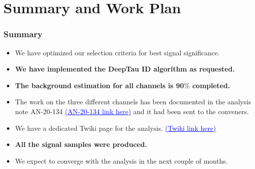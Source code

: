 \documentclass[8pt,xcolor=dvipsnames,xcolor=table]{beamer}
\begin{document}
\section{Summary and Work Plan}
\begin{frame}
\frametitle{Summary}
\Large{
\begin{itemize}
    \item We have optimized our selection criteria for best signal significance.
    \item \textbf{We have implemented the DeepTau ID algorithm as requested.}
    \item \textbf{The background estimation for all channels is 90$\%$ completed.}
    \item The work on the three different channels has been documented in the analysis note AN-20-134 \href{https://gitlab.cern.ch/tdr/notes/AN-20-134/-/blob/master/AN-20-134_temp.pdf}{\textcolor{blue}{\underline{(AN-20-134  link here)}}} and it had been sent to the conveners.
    \item We have a dedicated Twiki page for the analysis. \href{https://twiki.cern.ch/twiki/bin/viewauth/CMS/EXODYZprimeTauTau20134}{\textcolor{blue}{\underline{(Twiki link here)}}}
    \item \textbf{All the signal samples were produced.}
    \item We expect to converge with the analysis in the next couple of months.
    
\end{itemize}
}
\end{frame}
\appendix
\end{document}
